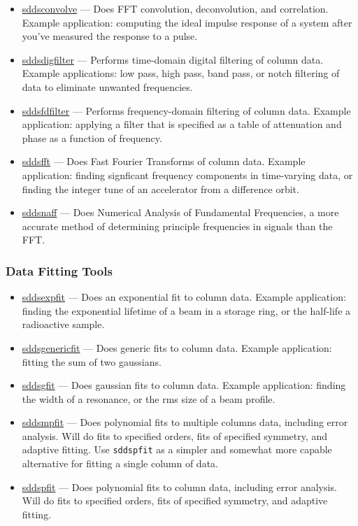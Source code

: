 \documentclass[11pt]{article}
\newcommand{\progref}[1]{\hyperref{#1}{{\tt #1} (}{)}{#1}}
\begin{document}
\begin{itemize}

\item \progref{sddsconvolve} --- Does FFT convolution, deconvolution, and correlation. Example
application: computing the ideal impulse response of a system after you've measured the response to
a pulse.

\item \progref{sddsdigfilter} --- Performs time-domain digital filtering of column data.  Example applications:
low pass, high pass, band pass, or notch filtering of data to eliminate unwanted frequencies.

\item \progref{sddsfdfilter} --- Performs frequency-domain filtering of column data.  Example application:
applying a filter that is specified as a table of attenuation and phase as a function of frequency.

\item \progref{sddsfft} --- Does Fast Fourier Transforms of column data.  Example application: finding signficant
frequency components in time-varying data, or finding the integer tune of an accelerator from a difference orbit.

\item \progref{sddsnaff} --- Does Numerical Analysis of Fundamental Frequencies, a more accurate
method of determining principle frequencies in signals than the FFT.

\end{itemize}

\subsubsection{Data Fitting Tools}

\begin{itemize}

\item \progref{sddsexpfit} --- Does an exponential fit to column data.  Example
application: finding the exponential lifetime of a beam in a storage ring, or the half-life a radioactive
sample.

\item \progref{sddsgenericfit} --- Does generic fits to column data.  Example application:
fitting the sum of two gaussians.

\item \progref{sddsgfit} --- Does gaussian fits to column data.  Example application:
finding the width of a resonance, or the rms size of a beam profile.


\item \progref{sddsmpfit} --- Does polynomial fits to multiple columns
data, including error analysis.  Will do fits to specified orders,
fits of specified symmetry, and adaptive fitting.  Use {\tt sddspfit}
as a simpler and somewhat more capable alternative for fitting a
single column of data.

\item \progref{sddspfit} --- Does polynomial fits to column data,
including error analysis.  Will do fits to specified orders, fits of
specified symmetry, and adaptive fitting.

\end{itemize}
\end{document}
